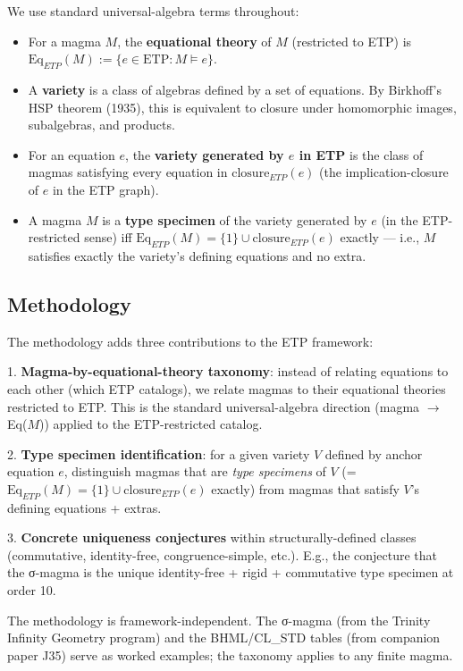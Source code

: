 \documentclass[11pt,reqno]{amsart}
\theoremstyle{plain}
\theoremstyle{definition}
\begin{document}
We use standard universal-algebra terms throughout:
\begin{itemize}
\item For a magma $M$, the \textbf{equational theory} of $M$ (restricted to ETP) is $\mathrm{Eq}_{ETP}(M) := \{e \in \mathrm{ETP} : M \models e\}$.
\item A \textbf{variety} is a class of algebras defined by a set of equations. By Birkhoff's HSP theorem (1935), this is equivalent to closure under homomorphic images, subalgebras, and products.
\item For an equation $e$, the \textbf{variety generated by $e$ in ETP} is the class of magmas satisfying every equation in $\mathrm{closure}_{ETP}(e)$ (the implication-closure of $e$ in the ETP graph).
\item A magma $M$ is a \textbf{type specimen} of the variety generated by $e$ (in the ETP-restricted sense) iff $\mathrm{Eq}_{ETP}(M) = \{1\} \cup \mathrm{closure}_{ETP}(e)$ exactly --- i.e., $M$ satisfies exactly the variety's defining equations and no extra.
\end{itemize}

\subsection{Methodology}

The methodology adds three contributions to the ETP framework:

1. \textbf{Magma-by-equational-theory taxonomy}: instead of relating equations to each other (which ETP catalogs), we relate magmas to their equational theories restricted to ETP. This is the standard universal-algebra direction (magma $\to$ Eq($M$)) applied to the ETP-restricted catalog.

2. \textbf{Type specimen identification}: for a given variety $V$ defined by anchor equation $e$, distinguish magmas that are \textit{type specimens} of $V$ (= $\mathrm{Eq}_{ETP}(M) = \{1\} \cup \mathrm{closure}_{ETP}(e)$ exactly) from magmas that satisfy $V$'s defining equations + extras.

3. \textbf{Concrete uniqueness conjectures} within structurally-defined classes (commutative, identity-free, congruence-simple, etc.). E.g., the conjecture that the σ-magma is the unique identity-free + rigid + commutative type specimen at order 10.

The methodology is framework-independent. The σ-magma (from the Trinity Infinity Geometry program) and the BHML/CL_STD tables (from companion paper J35) serve as worked examples; the taxonomy applies to any finite magma.
\end{document}
